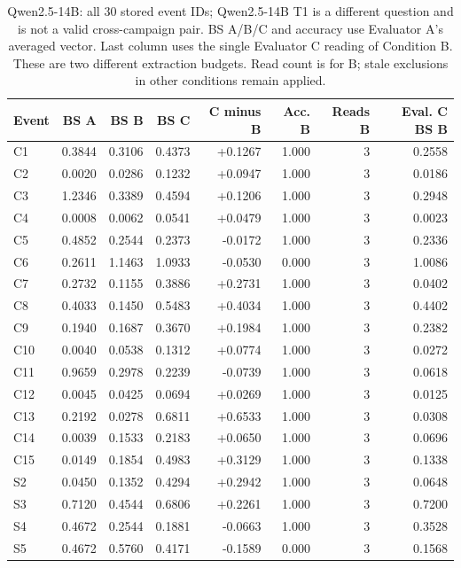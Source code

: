 \begin{table}[!htbp]
\centering\small
\caption{Qwen2.5-14B: all 30 stored event IDs; Qwen2.5-14B T1 is a different question and is not a valid cross-campaign pair. BS A/B/C and accuracy use Evaluator A's averaged vector. Last column uses the single Evaluator C reading of Condition B. These are two different extraction budgets. Read count is for B; stale exclusions in other conditions remain applied.}
\label{tab:full_events_qwen2514b}
\begin{tabular}{lrrrrrrr}
\toprule
Event & BS A & BS B & BS C & C minus B & Acc. B & Reads B & Eval. C BS B \\
\midrule
C1 & 0.3844 & 0.3106 & 0.4373 & +0.1267 & 1.000 & 3 & 0.2558 \\
C2 & 0.0020 & 0.0286 & 0.1232 & +0.0947 & 1.000 & 3 & 0.0186 \\
C3 & 1.2346 & 0.3389 & 0.4594 & +0.1206 & 1.000 & 3 & 0.2948 \\
C4 & 0.0008 & 0.0062 & 0.0541 & +0.0479 & 1.000 & 3 & 0.0023 \\
C5 & 0.4852 & 0.2544 & 0.2373 & -0.0172 & 1.000 & 3 & 0.2336 \\
C6 & 0.2611 & 1.1463 & 1.0933 & -0.0530 & 0.000 & 3 & 1.0086 \\
C7 & 0.2732 & 0.1155 & 0.3886 & +0.2731 & 1.000 & 3 & 0.0402 \\
C8 & 0.4033 & 0.1450 & 0.5483 & +0.4034 & 1.000 & 3 & 0.4402 \\
C9 & 0.1940 & 0.1687 & 0.3670 & +0.1984 & 1.000 & 3 & 0.2382 \\
C10 & 0.0040 & 0.0538 & 0.1312 & +0.0774 & 1.000 & 3 & 0.0272 \\
C11 & 0.9659 & 0.2978 & 0.2239 & -0.0739 & 1.000 & 3 & 0.0618 \\
C12 & 0.0045 & 0.0425 & 0.0694 & +0.0269 & 1.000 & 3 & 0.0125 \\
C13 & 0.2192 & 0.0278 & 0.6811 & +0.6533 & 1.000 & 3 & 0.0308 \\
C14 & 0.0039 & 0.1533 & 0.2183 & +0.0650 & 1.000 & 3 & 0.0696 \\
C15 & 0.0149 & 0.1854 & 0.4983 & +0.3129 & 1.000 & 3 & 0.1338 \\
S2 & 0.0450 & 0.1352 & 0.4294 & +0.2942 & 1.000 & 3 & 0.0648 \\
S3 & 0.7120 & 0.4544 & 0.6806 & +0.2261 & 1.000 & 3 & 0.7200 \\
S4 & 0.4672 & 0.2544 & 0.1881 & -0.0663 & 1.000 & 3 & 0.3528 \\
S5 & 0.4672 & 0.5760 & 0.4171 & -0.1589 & 0.000 & 3 & 0.1568 \\

\end{tabular}
\end{table}
